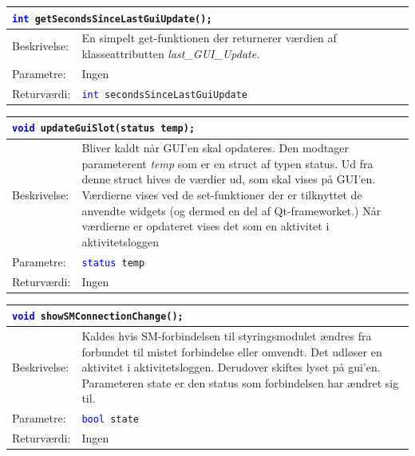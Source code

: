 \begin{table}[H]
\begin{tabular}{l p{12.5cm}}
\multicolumn{2}{l}{\texttt{\textcolor{blue}{int} getSecondsSinceLastGuiUpdate();}} \\
\hline
Beskrivelse:& En simpelt get-funktionen der returnerer værdien af klasseattributten \textit{last\_GUI\_Update.} \\
Parametre:&Ingen\\
Returværdi:&\texttt{\textcolor{blue}{int} secondsSinceLastGuiUpdate}\\
\end{tabular}
\end{table}

\begin{table}[H]
\begin{tabular}{l p{12.5cm}}
\multicolumn{2}{l}{\texttt{\textcolor{blue}{void} updateGuiSlot(status temp);}} \\
\hline
Beskrivelse:& Bliver kaldt når GUI'en skal opdateres. 
Den modtager parameterent \textit{temp} som er en struct af typen status. 
Ud fra denne struct hives de værdier ud, som skal vises på GUI'en. Værdierne vises ved de set-funktioner der er tilknyttet de anvendte widgets (og dermed en del af Qt-frameworket.) 
Når værdierne er opdateret vises det som en aktivitet i aktivitetsloggen \\   
Parametre:&\texttt{\textcolor{blue}{status} temp}\\
Returværdi:&Ingen\\
\end{tabular}
\end{table}

\begin{table}[H]
\begin{tabular}{l p{12.5cm}}
\multicolumn{2}{l}{\texttt{\textcolor{blue}{void} showSMConnectionChange();}} \\
\hline
Beskrivelse:& Kaldes hvis SM-forbindelsen til styringsmodulet ændres fra forbundet til mistet forbindelse eller omvendt. Det udløser en aktivitet i aktivitetsloggen. Derudover skiftes lyset på gui'en. Parameteren state er den status som forbindelsen har ændret sig til.\\   
Parametre:&\texttt{\textcolor{blue}{bool} state}\\
Returværdi:&Ingen\\
\end{tabular}
\end{table}

